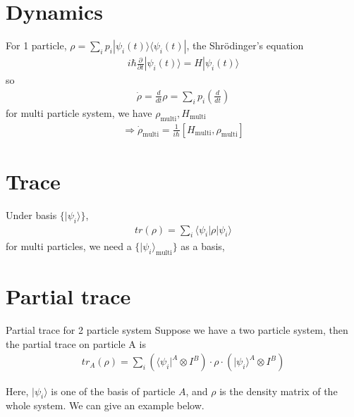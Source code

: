 \documentclass[UTF8,12pt]{article} %
\begin{document}
\section{Dynamics}

For 1 particle, $\rho = \sum_{i} p_{i} |\psi_{i}(t)\rangle\langle\psi_{i}(t)|$, the Shr\"{o}dinger's equation
\begin{align}
i\hbar\frac{\partial}{\partial t}|\psi_{i}(t)\rangle = H|\psi_{i}(t)\rangle
\end{align}
so
\begin{align}
\dot{\rho} = \frac{d}{dt} \rho = \sum_{i} p_{i}\left(\frac{d}{dt}\right)
\end{align}
for multi particle system, we have $\rho_{\text{multi}}, H_{\text{multi}}$
\begin{align}
\Rightarrow \dot{\rho}_{\text{multi}} = \frac{1}{i\hbar}[H_{\text{multi}},\rho_{\text{multi}}]
\end{align}

\section{Trace}

Under basis $\{|\psi_{i}\rangle\}$,
\begin{align}
tr(\rho) = \sum_{i}\langle\psi_{i}|\rho|\psi_{i}\rangle
\end{align}
for multi particles, we need a $\{|\psi_{i}\rangle_{\text{multi}}\}$ as a basis,

\section{Partial trace}

\begin{definition}{Partial trace for 2 particle system}{}\label{pt2}
Suppose we have a two particle system, then the partial trace on particle A is
\begin{align}
tr_{A}(\rho) = \sum_{i} \left(\langle\psi_{i}|^{A} \otimes I^{B}\right) \cdot \rho \cdot \left(|\psi_{i}\rangle^{A} \otimes I^{B}\right)
\end{align}
\end{definition}

Here, $|\psi_{i}\rangle$ is one of the basis of particle $A$, and $\rho$ is the density matrix of the whole system. We can give an example below.
\end{document}
